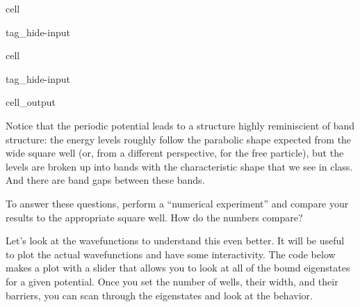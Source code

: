 \documentclass[letterpaper,10pt,english]{jupyterBook}
\begin{document}
\begin{sphinxuseclass}{cell}
\begin{sphinxuseclass}{tag_hide-input}
\end{sphinxuseclass}
\end{sphinxuseclass}
\begin{sphinxuseclass}{cell}
\begin{sphinxuseclass}{tag_hide-input}\begin{sphinxVerbatimOutput}

\begin{sphinxuseclass}{cell_output}
\begin{sphinxVerbatim}
\end{sphinxVerbatim}

\noindent{}

\end{sphinxuseclass}\end{sphinxVerbatimOutput}

\end{sphinxuseclass}
\end{sphinxuseclass}
\sphinxAtStartPar
Notice that the periodic potential leads to a structure highly reminiscient of band structure: the energy levels roughly follow the parabolic shape expected from the wide square well (or, from a different perspective, for the free particle), but the levels are broken up into bands with the characteristic shape that we see in class. And there are band gaps between these bands.

\sphinxAtStartPar
{}

\sphinxAtStartPar
To answer these questions, perform a “numerical experiment” and compare your results to the appropriate square well. How do the numbers compare?

\sphinxAtStartPar
{}

\sphinxAtStartPar
Let’s look at the wavefunctions to understand this even better. It will be useful to plot the actual wavefunctions and have some interactivity. The code below makes a plot with a slider that allows you to look at all of the bound eigenstates for a given potential. Once you set the number of wells, their width, and their barriers, you can scan through the eigenstates and look at the behavior.
\end{document}
